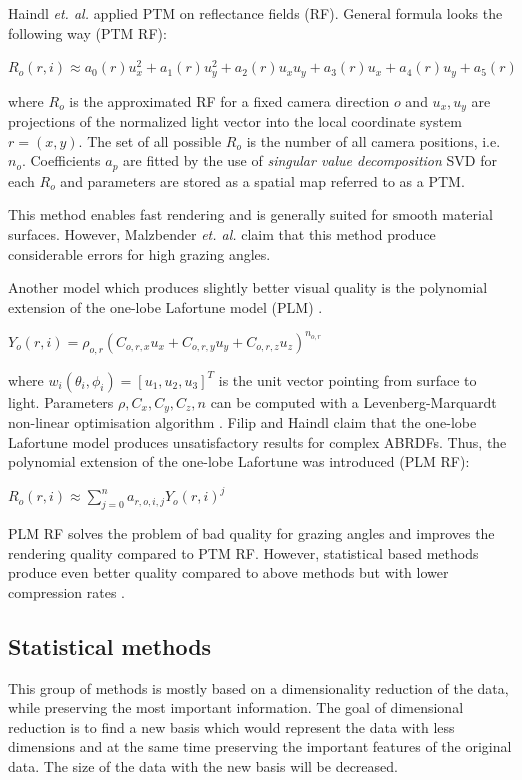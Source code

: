 Haindl  \emph{et. al.} \cite{haindl} applied PTM on reflectance fields (RF).
General formula looks the following way (PTM RF):

{\centering$R_{o}(r,i)\approx a_{0}(r)u_{x}^2+a_{1}(r)u_{y}^2+a_{2}(r)u_{x}u_{y}+a_{3}(r)u_{x}+a_{4}(r)u_{y}+a_{5}(r)$\\}

 where $R_{o}$ is the approximated RF for a fixed camera direction $o$ and $u_{x},u_{y}$ are projections of the normalized light vector into the local coordinate system $r=(x,y)$.
 The set of all possible $R_{o}$ is the number of all camera positions, i.e. $n_{o}$. 
 Coefficients $a_{p}$ are fitted by the use of \emph{singular value decomposition} SVD for each $R_{o}$ and parameters are stored as a spatial map referred to as a PTM.
 
  This method enables fast rendering and is generally suited for smooth material surfaces.
  However, Malzbender  \emph{et. al.} \cite{PTM} claim that this method produce considerable errors for high grazing angles. 

 
 Another model which produces slightly better visual quality is the polynomial extension of the one-lobe Lafortune model (PLM) \cite{haindl}.


{\centering$Y_{o} (r,i) = \rho_{o,r}(C_{o,r,x}u_{x}+C_{o,r,y}u_{y}+C_{o,r,z}u_{z})_{ }^{n_{o,r}}$\\}

where $w_{i}(\theta_{i}, \phi_{i})=[u_{1},u_{2},u_{3}]^{T}$ is the unit vector pointing from surface to light.
Parameters $\rho,C_{x},C_{y},C_{z},n$ can be computed with a Levenberg-Marquardt non-linear optimisation algorithm \cite{plm}. 
 Filip and Haindl \cite{plm} claim that the one-lobe Lafortune model produces unsatisfactory results for complex ABRDFs.
 Thus, the polynomial extension of the one-lobe Lafortune was introduced (PLM RF):

{\centering$R_{o}(r,i)\approx  \sum_{j=0}^{n} a_{r,o,i,j}Y_{o}(r,i)^j$\\}



PLM RF solves the problem of bad quality for grazing angles and improves the rendering quality compared to PTM RF.
However, statistical based methods produce even better quality compared to above methods but with lower compression rates \cite{haindl}.



  \subsection{Statistical methods}
\label{section:stat_methods}
This group of methods is mostly based on a dimensionality reduction of the data, while preserving the most important information.
The goal of dimensional reduction is to find a new basis which would represent the data with less dimensions and at the same time preserving the important features of the original data.
 The size of the data with the new basis will be decreased.


